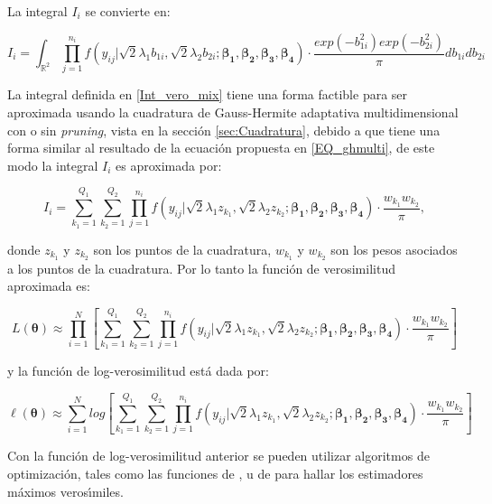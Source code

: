 La integral $I_i$ se convierte en:

\begin{equation}
I_i=\int_{\mathbb{R}^2}{\prod_{j=1}^{n_i}f(y_{ij}|\sqrt{2}\lambda_1b_{1i},\sqrt{2}\lambda_2 b_{2i};\boldsymbol{\beta_1}, \boldsymbol{\beta_2}, \boldsymbol{\beta_3}, \boldsymbol{\beta_4})\cdot \frac{exp(-b_{1i}^2) exp(-b_{2i}^2)}{\pi} db_{1i}db_{2i}}
\label{Int_vero_mix}
\end{equation}

La integral definida en \eqref{Int_vero_mix} tiene una forma factible para ser aproximada usando la cuadratura de Gauss-Hermite adaptativa multidimensional con o sin \textit{pruning}, vista en la secci\'{o}n \ref{sec:Cuadratura}, debido a que tiene una forma similar al resultado de la ecuaci\'{o}n propuesta en \eqref{EQ_ghmulti}, de este modo la integral $I_i$ es aproximada por:

\[
I_i=\sum_{k_1=1}^{Q_1}{\sum_{k_2=1}^{Q_2}{\prod_{j=1}^{n_i}f(y_{ij}|\sqrt{2}\lambda_1 z_{k_1},\sqrt{2}\lambda_2 z_{k_2};\boldsymbol{\beta_1}, \boldsymbol{\beta_2}, \boldsymbol{\beta_3}, \boldsymbol{\beta_4})\cdot \frac{w_{k_1}w_{k_2}}{\pi}}},
\]

donde $z_{k_1}$ y $z_{k_2}$ son los puntos de la cuadratura, $w_{k_1}$ y $w_{k_2}$ son los pesos asociados a los puntos de la cuadratura. Por lo tanto la funci\'{o}n de verosimilitud aproximada es:

\[
L(\boldsymbol{\theta}) \approx \prod_{i=1}^{N}{\left[\sum_{k_1=1}^{Q_1}{\sum_{k_2=1}^{Q_2}{\prod_{j=1}^{n_i}f(y_{ij}|\sqrt{2}\lambda_1 z_{k_1},\sqrt{2}\lambda_2 z_{k_2};\boldsymbol{\beta_1}, \boldsymbol{\beta_2}, \boldsymbol{\beta_3}, \boldsymbol{\beta_4})\cdot \frac{w_{k_1}w_{k_2}}{\pi}}}\right]}
\]

y la funci\'{o}n de log-verosimilitud est\'{a} dada por:

\begin{equation}
\ell(\boldsymbol{\theta}) \approx \sum_{i=1}^{N}log{\left[\sum_{k_1=1}^{Q_1}{\sum_{k_2=1}^{Q_2}{\prod_{j=1}^{n_i}f(y_{ij}|\sqrt{2}\lambda_1 z_{k_1},\sqrt{2}\lambda_2 z_{k_2};\boldsymbol{\beta_1}, \boldsymbol{\beta_2}, \boldsymbol{\beta_3}, \boldsymbol{\beta_4})\cdot \frac{w_{k_1}w_{k_2}}{\pi}}}\right]}
\label{LOG_vero_mix}
\end{equation}

Con la funci\'{o}n de log-verosimilitud anterior se pueden utilizar algoritmos de optimizaci\'{o}n, tales como las funciones de ,  u  de  para hallar los estimadores m\'{a}ximos veros\'{\i}miles.\\

